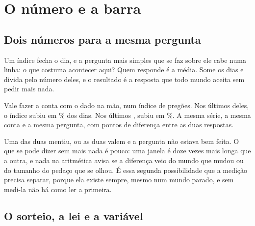 %
%

\chapter{O número e a barra}
\label{cap:barra}

\section{Dois números para a mesma pergunta}

Um índice fecha o dia, e a pergunta mais simples que se faz sobre ele cabe numa linha: o que
costuma acontecer aqui? Quem responde é a média. Some os dias e divida pelo número deles, e o
resultado é a resposta que todo mundo aceita sem pedir mais nada.

Vale fazer a conta com o dado na mão, num índice de \numBarraSerieDias{} pregões. Nos últimos
\numFracaoCurtaDias{} deles, o índice subiu em \numFracaoCurtaPct\% dos dias. Nos últimos
\numFracaoLongaDias{}, subiu em \numFracaoLongaPct\%. A mesma série, a mesma conta e a mesma
pergunta, com \numFracaoDiferencaPct{} pontos de diferença entre as duas respostas.

Uma das duas mentiu, ou as duas valem e a pergunta não estava bem feita. O que se pode dizer
sem mais nada é pouco: uma janela é doze vezes mais longa que a outra, e nada na aritmética
avisa se a diferença veio do mundo que mudou ou do tamanho do pedaço que se olhou. É essa
segunda possibilidade que a medição precisa separar, porque ela existe sempre, mesmo num mundo
parado, e sem medi-la não há como ler a primeira.

\section{O sorteio, a lei e a variável}

